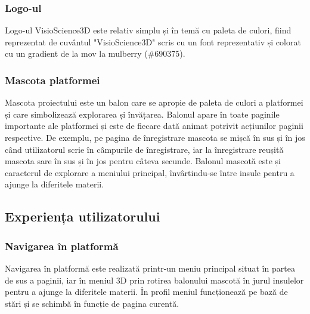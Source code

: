 
\subsubsection{Logo-ul}
Logo-ul VisioScience3D este relativ simplu și în temă cu paleta de culori, fiind reprezentat
de cuvântul "VisioScience3D" scris cu un font reprezentativ și colorat cu un gradient de la
mov la mulberry (\#690375).


\subsubsection{Mascota platformei}
Mascota proiectului este un balon care se apropie de paleta de culori a platformei
și care simbolizează explorarea și învățarea. Balonul apare în toate paginile importante ale platformei
și este de fiecare dată animat potrivit acțiunilor paginii respective. De exemplu, pe pagina de 
înregistrare mascota se mișcă în sus și în jos când utilizatorul scrie în câmpurile de
înregistrare, iar la înregistrare reușită mascota sare în sus și în jos pentru câteva secunde.
Balonul mascotă este și caracterul de explorare a meniului principal, învârtindu-se între
insule pentru a ajunge la diferitele materii.


\subsection{Experiența utilizatorului}


\subsubsection{Navigarea în platformă}

Navigarea în platformă este realizată printr-un meniu principal situat în partea de sus a paginii,
iar în meniul 3D prin rotirea balonului mascotă în jurul insulelor pentru a ajunge la diferitele materii.
În profil meniul funcționează pe bază de stări și se schimbă în funcție de pagina curentă.

